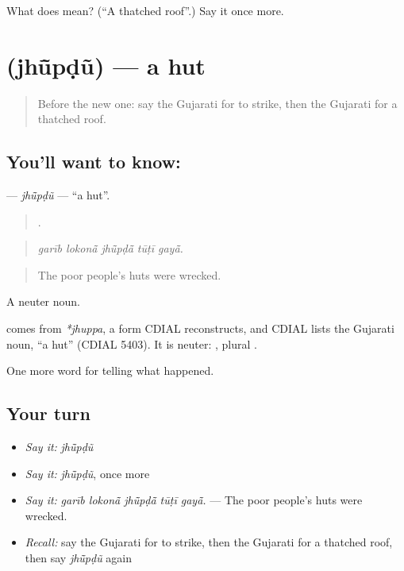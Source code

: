 \begin{tcolorbox}[breakable,colback=teal!4,colframe=teal!35!black,title={Before you move on}]
What does  mean? (\textquotedblleft{}A thatched roof\textquotedblright{}.) Say it once more.
\end{tcolorbox}
\section[\texorpdfstring{\gu{ઝૂંપડું} (jhū̃pḍũ)}{ઝૂંપડું (jhū̃pḍũ)}]{ (jhū̃pḍũ) — a hut}

\label{lesson:GU-C303-jhupdu}



\begin{quote}
Before the new one: say the Gujarati for to strike, then the Gujarati for a thatched roof.
\end{quote}

\subsection*{You'll want to know: }
\textbf{} — \emph{jhū̃pḍũ} — \textquotedblleft{}a hut\textquotedblright{}.

\begin{quote}
    .
\end{quote}

\begin{quote}
\emph{garīb lokonā̃ jhū̃pḍā̃ tūṭī gayā̃.}
\end{quote}

\begin{quote}
The poor people's huts were wrecked.
\end{quote}

A neuter noun.

\begin{cousinweb}
comes from \emph{*jhuppa}, a form CDIAL reconstructs, and CDIAL lists the Gujarati noun, \textquotedblleft{}a hut\textquotedblright{} (CDIAL 5403). It is neuter: \textbf{}, plural \textbf{}.
\end{cousinweb}

\begin{grammarlens}[title={What you've built}]
One more word for telling what happened.
\end{grammarlens}

\subsection*{Your turn}
\begin{itemize}
\raggedright
  \item \emph{Say it:} \emph{jhū̃pḍũ}
  \item \emph{Say it:} \emph{jhū̃pḍũ}, once more
  \item \emph{Say it:} \emph{garīb lokonā̃ jhū̃pḍā̃ tūṭī gayā̃.} — The poor people's huts were wrecked.
  \item \emph{Recall:} say the Gujarati for to strike, then the Gujarati for a thatched roof, then say \emph{jhū̃pḍũ} again
\end{itemize}

